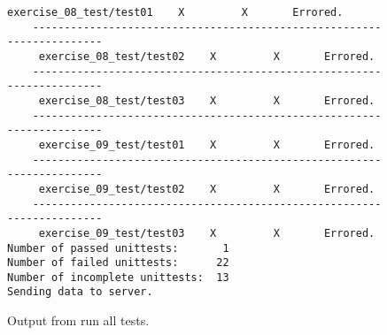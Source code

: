\begin{figure}
\begin{lstlisting}[basicstyle=\scriptsize]
     exercise_08_test/test01    X         X       Errored.
    ----------------------------------------------------------------------
     exercise_08_test/test02    X         X       Errored.
    ----------------------------------------------------------------------
     exercise_08_test/test03    X         X       Errored.
    ----------------------------------------------------------------------
     exercise_09_test/test01    X         X       Errored.
    ----------------------------------------------------------------------
     exercise_09_test/test02    X         X       Errored.
    ----------------------------------------------------------------------
     exercise_09_test/test03    X         X       Errored.
Number of passed unittests:       1
Number of failed unittests:      22
Number of incomplete unittests:  13
Sending data to server.
\end{lstlisting}
\caption{Output from run all tests.}
\label{figRunAllTestsOutput}
\end{figure}



